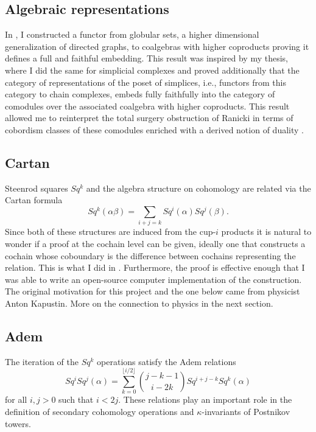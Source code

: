\subsection{Algebraic representations}

In \cite{medina2020globular}, I constructed a functor from globular sets, a higher dimensional generalization of directed graphs, to coalgebras with higher coproducts proving it defines a full and faithful embedding.
This result was inspired by my thesis, where I did the same for simplicial complexes and proved additionally that the category of representations of the poset of simplices, i.e., functors from this category to chain complexes, embeds fully faithfully into the category of comodules over the associated coalgebra with higher coproducts.
This result allowed me to reinterpret the total surgery obstruction of Ranicki \cite{ranicki1992topological} in terms of cobordism classes of these comodules enriched with a derived notion of duality \cite{medina2015thesis}.

\subsection{Cartan} \label{ss:cartan}

Steenrod squares $Sq^k$ and the algebra structure on cohomology are related via the Cartan formula
\begin{equation*}
Sq^k(\alpha \beta) = \sum_{i+j=k} Sq^i(\alpha) Sq^j(\beta).
\end{equation*}
Since both of these structures are induced from the cup-$i$ products it is natural to wonder if a proof at the cochain level can be given, ideally one that constructs a cochain whose coboundary is the difference between cochains representing the relation.
This is what I did in \cite{medina2020cartan}.
Furthermore, the proof is effective enough that I was able to write an open-source computer implementation of the construction.
The original motivation for this project and the one below came from physicist Anton Kapustin.
More on the connection to physics in the next section.

\subsection{Adem} \label{ss:adem}

The iteration of the $Sq^k$ operations satisfy the Adem relations
\begin{equation*}
Sq^i Sq^j(\alpha) = \sum_{k=0}^{\lfloor i/2 \rfloor} \binom{j-k-1}{i-2k} Sq^{i+j-k} Sq^k(\alpha)
\end{equation*}
for all $i,j > 0$ such that $i < 2j$.
These relations play an important role in the definition of secondary cohomology operations and $\kappa$-invariants of Postnikov towers.

